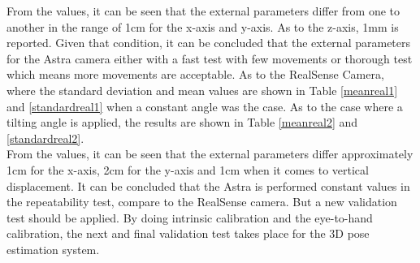 From the values, it can be seen that the external parameters differ from one to another in the range of 1cm for the x-axis and y-axis. As to the z-axis, 1mm is reported. Given that condition, it can be concluded that the external parameters for the Astra camera either with a fast test with few movements or thorough test which means more movements are acceptable.
As to the RealSense Camera, where the standard deviation and mean values are shown in Table \ref{meanreal1} and \ref{standardreal1} when a constant angle was the case. As to the case where a tilting angle is applied, the results are shown in Table \ref{meanreal2} and \ref{standardreal2}.\\
From the values, it can be seen that the external parameters differ approximately 1cm for the x-axis, 2cm for the y-axis and 1cm  when it comes to vertical displacement.  It can be concluded that the Astra is performed constant values in the repeatability test, compare to the RealSense camera. But a new validation test should be applied. 
By doing intrinsic calibration and the eye-to-hand calibration, the next and final validation test takes place for the 3D pose estimation system.

